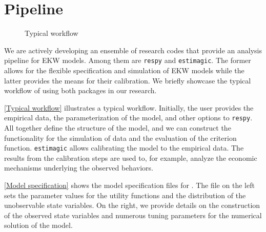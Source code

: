 \section{Pipeline}

\begin{figure}[b!]\centering
	
	\caption{Typical workflow}\label{Typical workflow}
\end{figure}%

We are actively developing an ensemble of research codes that provide an analysis pipeline for EKW models. Among them are \verb+respy+ and \verb+estimagic+. The former allows for the flexible specification and simulation of EKW models while the latter provides the means for their calibration. We briefly showcase the typical workflow of using both packages in our research.


\autoref{Typical workflow} illustrates a typical workflow. Initially, the user provides the empirical data, the parameterization of the model, and other options to \verb+respy+. All together define the structure of the model, and we can construct the functionality for the simulation of data and the evaluation of the criterion function. \verb+estimagic+ allows calibrating the model to the empirical data. The results from the calibration steps are used to, for example, analyze the economic mechanisms underlying the observed behaviors.

\autoref{Model specification} shows the model specification files for \citet{Keane.1997}. The file on the left sets the parameter values for the utility functions and the distribution of the unobservable state variables. On the right, we provide details on the construction of the observed state variables and numerous tuning parameters for the numerical solution of the model.

